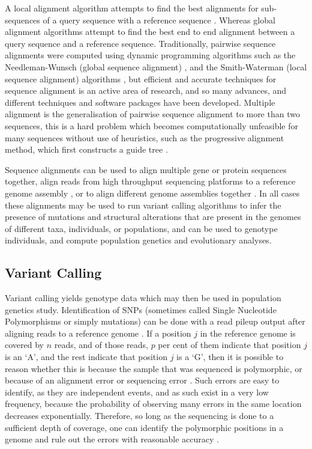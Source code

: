 A local alignment algorithm attempts to find the best alignments for sub-sequences of a query sequence with a reference sequence \parencite{Lemey2009b}.
Whereas global alignment algorithms attempt to find the best end to end alignment between a query sequence and a reference sequence.
Traditionally, pairwise sequence alignments were computed using dynamic programming algorithms such as the Needleman-Wunsch (global sequence alignment) \parencite{Needleman1970}, and the Smith-Waterman (local sequence alignment) algorithms \parencite{Smith1981}, but efficient and accurate techniques for sequence alignment is an active area of research, and so many advances, and different techniques and software packages have been developed.
Multiple alignment is the generalisation of pairwise sequence alignment to more than two sequences, this is a hard problem which becomes computationally unfeasible for many sequences without use of heuristics, such as the progressive alignment method, which first constructs a guide tree \parencite{Loytynoja2005}.

Sequence alignments can be used to align multiple gene or protein sequences together, align reads from high throughput sequencing platforms to a reference genome assembly \parencite{Li2009b}, or to align different genome assemblies together \parencite{Paten2011}.
In all cases these alignments may be used to run variant calling algorithms to infer the presence of mutations and structural alterations that are present in the genomes of different taxa, individuals, or populations, and can be used to genotype individuals, and compute population genetics and evolutionary analyses.


\subsection{Variant Calling}

Variant calling yields genotype data which may then be used in population genetics study.
Identification of SNPs (sometimes called Single Nucleotide Polymorphisms or simply mutations) can be done with a read pileup output after aligning reads to a reference genome \parencite{Li2009a,Li2011}.
If a position $j$ in the reference genome is covered by $n$ reads, and of those reads, $p$ per cent of them indicate that position $j$ is an ‘A’, and the rest indicate that position $j$ is a ‘G’, then it is possible to reason whether this is because the sample that was sequenced is polymorphic, or because of an alignment error or sequencing error \parencite{makinen2015genome}.
Such errors are easy to identify, as they are independent events, and as such exist in a very low frequency, because the probability of observing many errors in the same location decreases exponentially.
Therefore, so long as the sequencing is done to a sufficient depth of coverage, one can identify the polymorphic positions in a genome and rule out the errors with reasonable accuracy \parencite{makinen2015genome}.

